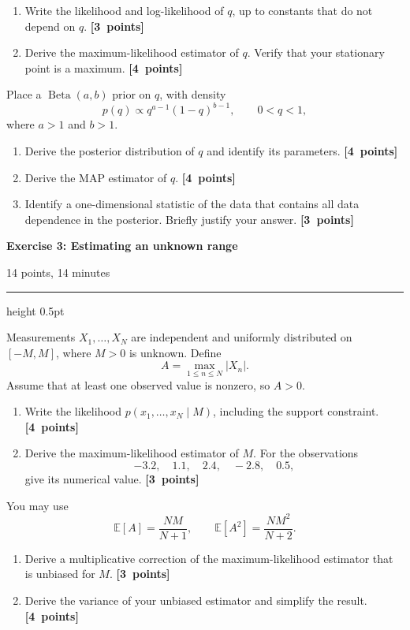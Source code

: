 \documentclass[11pt,a4paper]{article}
\newcommand{\points}[1]{\unskip\nobreak\hfill\mbox{\textbf{[#1 points]}}}
\newcommand{\exercise}[3]{%
  \Needspace{8\baselineskip}%
  \par\addvspace{1.1em}%
  \noindent
  \begin{minipage}[t]{0.73\textwidth}
    \vspace{0pt}\raggedright\large\bfseries\color{examblue}
    Exercise #1: #2
  \end{minipage}\hfill
  \begin{minipage}[t]{0.24\textwidth}
    \vspace{0pt}\raggedleft\small\color{examblue}#3
  \end{minipage}%
  \par\nobreak\vspace{0.2em}%
  {\color{rulegray}\hrule height 0.5pt}%
  \vspace{0.55em}%
}
\begin{document}
\begin{enumerate}[resume]
  \item Write the likelihood and log-likelihood of $q$, up to constants that do not depend on $q$. \points{3}
  \item Derive the maximum-likelihood estimator of $q$. Verify that your stationary point is a maximum. \points{4}
\end{enumerate}

Place a $\operatorname{Beta}(a,b)$ prior on $q$, with density
\[
  p(q)\propto q^{a-1}(1-q)^{b-1},\qquad 0<q<1,
\]
where $a>1$ and $b>1$.

\begin{enumerate}[resume]
  \item Derive the posterior distribution of $q$ and identify its parameters. \points{4}
  \item Derive the MAP estimator of $q$. \points{4}
  \item Identify a one-dimensional statistic of the data that contains all data dependence in the posterior. Briefly justify your answer. \points{3}
\end{enumerate}

\exercise{3}{Estimating an unknown range}{14 points, 14 minutes}

Measurements $X_1,\ldots,X_N$ are independent and uniformly distributed on $[-M,M]$, where $M>0$ is unknown. Define
\[
  A=\max_{1\leq n\leq N}|X_n|.
\]
Assume that at least one observed value is nonzero, so $A>0$.

\begin{enumerate}
  \item Write the likelihood $p(x_1,\ldots,x_N\mid M)$, including the support constraint. \points{4}
  \item Derive the maximum-likelihood estimator of $M$. For the observations
  \[
    -3.2,\quad 1.1,\quad 2.4,\quad -2.8,\quad 0.5,
  \]
  give its numerical value. \points{3}
\end{enumerate}

You may use
\[
  \mathbb{E}[A]=\frac{NM}{N+1},
  \qquad
  \mathbb{E}[A^2]=\frac{NM^2}{N+2}.
\]

\begin{enumerate}[resume]
  \item Derive a multiplicative correction of the maximum-likelihood estimator that is unbiased for $M$. \points{3}
  \item Derive the variance of your unbiased estimator and simplify the result. \points{4}
\end{enumerate}
\end{document}
